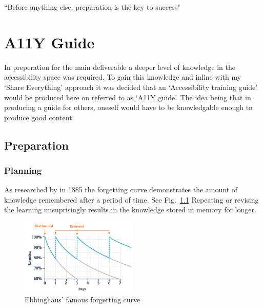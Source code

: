 \begin{savequote}[75mm]
``Before anything else, preparation is the key to success"
\end{savequote}

\chapter{A11Y Guide}
In preperation for the main deliverable a deeper level of knowledge in the
accessibility space was required. To gain this knowledge and inline with my
`Share Everything' approach it was decided that an `Accessibility
training guide' would be produced here on referred to as `A11Y guide'. The idea
being that in producing a guide for others, oneself would have to be
knowledgable enough to produce good content.

\section{Preparation}
\subsection{Planning}
As researched by \citep{Ebbinghaus} in 1885 the forgetting curve demonstrates the
amount of knowledge remembered after a period of time. See Fig.~\ref{fig:ebbinghaus}
Repeating or revising the learning unsuprisingly results in the knowledge
stored in memory for longer.

\begin{figure}[H]
\centering
\includegraphics[width=0.5\textwidth]{figures/ebbinghaus}
\captionsetup{justification=centering}
\caption{Ebbinghaus' famous forgetting curve
\label{fig:ebbinghaus}}
\end{figure}

